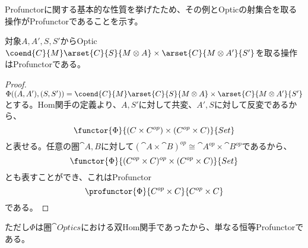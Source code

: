 \documentclass[uplatex,dvipdfmx]{jsarticle}
\begin{document}
  Profunctorに関する基本的な性質を挙げたため、その例とOpticの射集合を取る操作がProfunctorであることを示す。

  \begin{prop}\label{prop-optic-as-profunctor}
    対象$A,A',S,S'$からOptic $\coend{C}{M}\arset{C}{S}{M\otimes A}\times\arset{C}{M\otimes A'}{S'}$を取る操作はProfunctorである。
  \end{prop}
  \begin{proof}
    $\Phi((A,A'),(S,S'))=\coend{C}{M}\arset{C}{S}{M\otimes A}\times\arset{C}{M\otimes A'}{S'}$とする。Hom関手の定義より、$A,S'$に対して共変、$A',S$に対して反変であるから、\[\functor{\Phi}{(C\times C^{op})\times (C^{op}\times C)}{Set}\]と表せる。任意の圏$\cat{A,B}$に対して$(\cat{A}\times \cat{B})^{op}\cong \cat{A}^{op}\times \cat{B}^{op}$であるから、\[\functor{\Phi}{(C^{op}\times C)^{op}\times (C^{op}\times C)}{Set}\]とも表すことができ、これはProfunctor\[\profunctor{\Phi}{C^{op}\times C}{C^{op}\times C}\]である。
  \end{proof}

  ただし$\Phi$は圏$\cat{Optics}$における双Hom関手であったから、単なる恒等Profunctorである。
\end{document}
